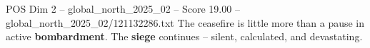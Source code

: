 \begin{textsample}{POS Dim 2 – global\_north\_2025\_02 – Score 19.00 – global\_north\_2025\_02/121132286.txt}
The ceasefire is little more than a pause in active \textbf{bombardment}.
The \textbf{siege} continues -- silent, calculated, and devastating.

\end{textsample}
